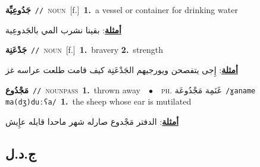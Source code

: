\documentclass[10pt,a4paper,twoside]{article} %
\begin{document}
\begin{multicols}{2}
{\setlength\topsep{0pt}\textbf{\foreignlanguage{arabic}{جَدُوعِيِّة}}\ {\color{gray}\texttt{//}\color{black}}\ \textsc{noun}\ [f.]\ \textbf{1.}~a vessel or container for drinking water\  \begin{flushright}\color{gray}\foreignlanguage{arabic}{\textbf{\underline{\foreignlanguage{arabic}{أمثلة}}}: بقينا نشرب المي بالجَدوعِية}\end{flushright}\color{black}} \vspace{2mm}

{\setlength\topsep{0pt}\textbf{\foreignlanguage{arabic}{جَدْعَنِة}}\ {\color{gray}\texttt{//}\color{black}}\ \textsc{noun}\ [f.]\ \textbf{1.}~bravery  \textbf{2.}~strength\  \begin{flushright}\color{gray}\foreignlanguage{arabic}{\textbf{\underline{\foreignlanguage{arabic}{أمثلة}}}: إِجى يتفصحن ويورجيهم الجَدْعَنِة كيف قامت طلعت عراسه غز}\end{flushright}\color{black}} \vspace{2mm}

{\setlength\topsep{0pt}\textbf{\foreignlanguage{arabic}{مَجْدُوع}}\ {\color{gray}\texttt{//}\color{black}}\ \textsc{noun\textunderscore pass}\ \textbf{1.}~thrown away\ \ $\bullet$\ \ \textsc{ph.} \color{gray} \foreignlanguage{arabic}{غَنَمِة مَجْدُوعَة}\color{black}\ {\color{gray}\texttt{/{\sffamily ɣaname ma(dʒ)duːʕa}/}\color{black}}\ \textbf{1.}~the sheep whose ear is mutilated\  \begin{flushright}\color{gray}\foreignlanguage{arabic}{\textbf{\underline{\foreignlanguage{arabic}{أمثلة}}}: الدفتر مَجْدوع صارله شهر ماحدا قايله عإِيش}\end{flushright}\color{black}} \vspace{2mm}

\vspace{-3mm}
\subsection*{\color{blue}\foreignlanguage{arabic}{ج.د.ل}\color{blue}{}} 


\end{multicols}
\end{document}
